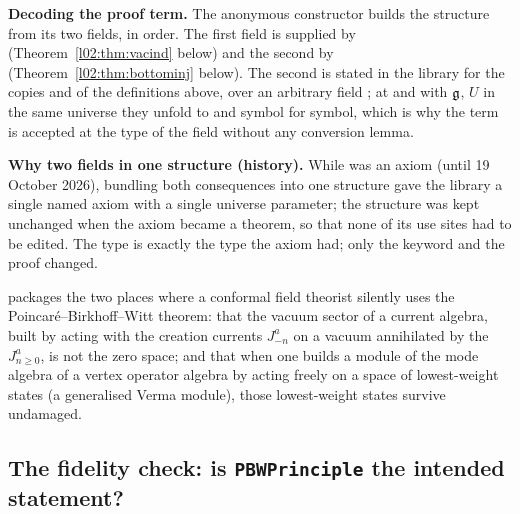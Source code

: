 \begin{dictionary}
\textbf{Decoding the proof term.} The anonymous constructor  builds the structure from its
two fields, in order. The first field is supplied by \allowbreak{}\allowbreak{}\allowbreak{}\allowbreak{}\allowbreak{}
(Theorem~\ref{l02:thm:vacind} below) and the second by \allowbreak{}\allowbreak{}
(Theorem~\ref{l02:thm:bottominj} below). The second is stated in the library for the copies
 and  of the definitions above, over an arbitrary
field ; at  and with $\mathfrak{g}$, $U$ in the same universe they unfold to
 and  symbol for symbol, which is why the
term  is accepted at the type of the field
 without any conversion lemma.

\textbf{Why two fields in one structure (history).} While  was an axiom (until
19 October 2026), bundling both consequences into one structure gave the library a single named axiom
with a single universe parameter; the structure was kept unchanged when the axiom became a theorem, so
that none of its use sites had to be edited. The type  is exactly the type the axiom
had; only the keyword and the proof changed.
\end{dictionary}

\begin{physics}
 packages the two places where a conformal field theorist silently uses the
Poincar\'e--Birkhoff--Witt theorem: that the vacuum sector of a current algebra, built by acting with the
creation currents $J^a_{-n}$ on a vacuum annihilated by the $J^a_{n\ge0}$, is not the zero space; and that
when one builds a module of the mode algebra of a vertex operator algebra by acting freely on a space of
lowest-weight states (a generalised Verma module), those lowest-weight states survive undamaged.
\end{physics}

\subsection{The fidelity check: is \texorpdfstring{\texttt{PBWPrinciple}}{PBWPrinciple} the intended statement?}

